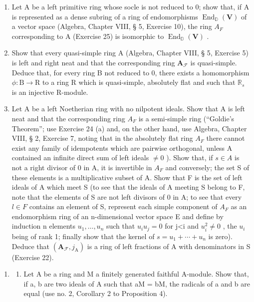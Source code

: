 \begin{enumerate}
\def\labelenumi{(\alph{enumi})}
\setcounter{enumi}{1}
\item
  Let A be a left primitive ring whose socle is not reduced to 0; show that, if A is represented as a dense subring of a ring of endomorphisms \(\operatorname{End}_{\mathbb{D}}(\mathbf{V})\) of a vector space (Algebra, Chapter VIII, § 5, Exercise 10), the ring \(A_{F}\) corresponding to A (Exercise 25) is isomorphic to \(\operatorname{End}_{\mathbb{D}}(\mathbf{V})\) .
\item
  Show that every quasi-simple ring A (Algebra, Chapter VIII, § 5, Exercise 5) is left and right neat and that the corresponding ring \(\mathbf{A}_{\mathcal{F}}\) is quasi-simple. Deduce that, for every ring B not reduced to 0, there exists a homomorphism \(\phi: \mathrm{B} \to \mathrm{R}\) to a ring R which is quasi-simple, absolutely flat and such that \(\mathbb{R}_s\) is an injective R-module.
\item
  Let A be a left Noetherian ring with no nilpotent ideals. Show that A is left neat and that the corresponding ring \(A_{F}\) is a semi-simple ring (``Goldie's Theorem''; use Exercise 24 (a) and, on the other hand, use Algebra, Chapter VIII, § 2, Exercise 7, noting that in the absolutely flat ring \(A_{F}\) there cannot exist any family of idempotents which are pairwise orthogonal, unless A contained an infinite direct sum of left ideals \(\neq0\) ). Show that, if \(s\in A\) is not a right divisor of 0 in A, it is invertible in \(A_{F}\) and conversely; the set S of these elements is a multiplicative subset of A. Show that F is the set of left ideals of A which meet S (to see that the ideals of A meeting S belong to F, note that the elements of S are not left divisors of 0 in A; to see that every \(l\in F\) contains an element of S, represent each simple component of \(A_{F}\) as an endomorphism ring of an n-dimensional vector space E and define by induction n elements \(u_{1},\ldots,u_{n}\) such that \(u_{i}u_{j}=0\) for j\textless i and \(u_{i}^{2}\neq0\) , the \(u_{i}\) being of rank 1; finally show that the kernel of \(s=u_{1}+\cdots+u_{n}\) is zero). Deduce that \((\mathbf{A}_{\mathcal{F}},j_{\mathrm{A}})\) is a ring of left fractions of A with denominators in S (Exercise 22).
\end{enumerate}

\begin{enumerate}
\def\labelenumi{\arabic{enumi}.}
\setcounter{enumi}{26}
\tightlist
\item
  \begin{enumerate}
  \def\labelenumii{(\alph{enumii})}
  \tightlist
  \item
    Let A be a ring and M a finitely generated faithful A-module. Show that, if a, b are two ideals of A such that aM = bM, the radicals of a and b are equal (use no. 2, Corollary 2 to Proposition 4).
  \end{enumerate}
\end{enumerate}

